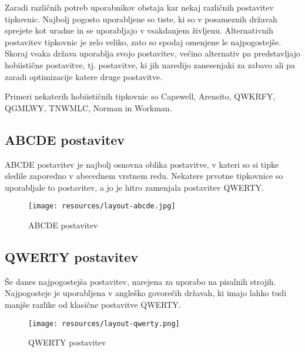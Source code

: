 

  Zaradi različnih potreb uporabnikov obstaja kar nekaj različnih postavitev tipkovnic.
  Najbolj pogosto uporabljene so tiste, ki so v posameznih državah sprejete kot uradne in se uporabljajo v vsakdanjem življenu.
  Alternativnih postavitev tipkovnic je zelo veliko, zato so spodaj omenjene le najpogostejše.
  Skoraj vsaka država uporablja svojo postavitev, večino alternativ pa predstavljajo hobiistične postavitve,
  tj. postavitve, ki jih naredijo zanesenjaki za zabavo ali pa zaradi optimizacije katere druge postavitve.

  Primeri nekaterih hobiističnih tipkovnic so Capewell, Arensito, QWKRFY, QGMLWY, TNWMLC, Norman in Workman.

  \subsection{ABCDE postavitev}\label{subsec:abcde}

  ABCDE postavitev je najbolj osnovna oblika postavitve,
  v kateri so si tipke sledile zaporedno v abecednem vrstnem redu.
  Nekatere prvotne tipkovnice so uporabljale to postavitev, a jo je hitro zamenjala postavitev QWERTY. \\

  \begin{figure}[h]
    \begin{center}
      \texttt{[image: resources/layout-abcde.jpg]}
      \caption{ABCDE postavitev}
    \end{center}
  \end{figure}

  \newpage
  \subsection{QWERTY postavitev}\label{subsec:qwerty}

  Še danes najpogostejša postavitev, narejena za uporabo na pisalnih strojih.
  Najpogosteje je uporabljena v angleško govorečih državah,
  ki imajo lahko tudi manjše razlike od klasične postavitve QWERTY. \\

  \begin{figure}[h]
    \begin{center}
      \texttt{[image: resources/layout-qwerty.png]}
      \caption{QWERTY postavitev}
    \end{center}
  \end{figure}

